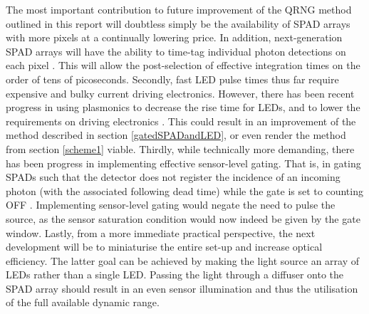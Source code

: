 \documentclass[]{article}
\begin{document}
	The most important contribution to future improvement of the QRNG method outlined in this report will doubtless simply be the availability of SPAD arrays with more pixels at a continually lowering price. In addition, next-generation SPAD arrays will have the ability to time-tag individual photon detections on each pixel \cite{antolovic_spad_2017}. This will allow the post-selection of effective integration times on the order of tens of picoseconds. Secondly, fast LED pulse times thus far require expensive and bulky current driving electronics. However, there has been recent progress in using plasmonics to decrease the rise time for LEDs, and to lower the requirements on driving electronics \cite{tsakmakidis_large_2016}. This could result in an improvement of the method described in section \ref{gatedSPADandLED}, or even render the method from section \ref{scheme1} viable. Thirdly, while technically more demanding, there has been progress in implementing effective sensor-level gating. That is, in gating SPADs such that the detector does not register the incidence of an incoming photon (with the associated following dead time) while the gate is set to counting OFF \cite{tosi_fast-gated_2011}. Implementing sensor-level gating would negate the need to pulse the source, as the sensor saturation condition would now indeed be given by the gate window. Lastly, from a more immediate practical perspective, the next development will be to miniaturise the entire set-up and increase optical efficiency. The latter goal can be achieved by making the light source an array of LEDs rather than a single LED. Passing the light through a diffuser onto the SPAD array should result in an even sensor illumination and thus the utilisation of the full available dynamic range.
	
\clearpage


\end{document}
